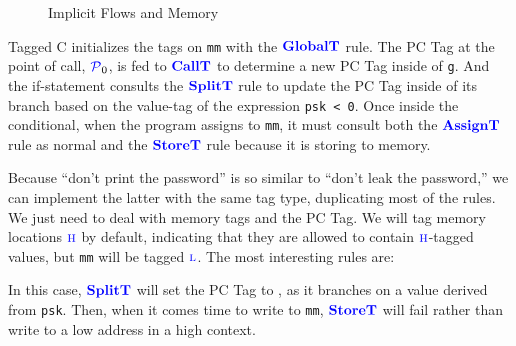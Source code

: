 \documentclass{llncs}
\begin{document}
\begin{figure}
\caption{Implicit Flows and Memory}
\label{fig:ex2}
\end{figure}

Tagged C initializes the tags on {\tt mm} with the \(\color{blue} \mathbf{GlobalT}\) rule. The PC Tag
at the point of call, \(\mathcal{\color{blue} P}_0\), is fed to \(\color{blue} \mathbf{CallT}\) to determine a new PC Tag
inside of {\tt g}. And the if-statement consults the \(\color{blue} \mathbf{SplitT}\) rule to update the PC Tag
inside of its branch based on the value-tag of the expression {\tt psk < 0}. Once inside the
conditional, when the program assigns to {\tt mm}, it must consult both the
\(\color{blue} \mathbf{AssignT}\) rule as normal and the \(\color{blue} \mathbf{StoreT}\) rule because it is storing
to memory.

Because ``don't print the password'' is so similar to ``don't leak the password,'' we can
implement the latter with the same tag type, duplicating most of the rules. We just need to
deal with memory tags and the PC Tag. We will tag memory
locations \(\textnormal{\color{blue} \sc h}\) by default, indicating that they are allowed to contain \(\textnormal{\color{blue} \sc h}\)-tagged values,
but {\tt mm} will be tagged \(\textnormal{\color{blue} \sc l}\). The most interesting rules are:

\begin{figure}
\end{figure}

In this case, \(\color{blue} \mathbf{SplitT}\) will set the PC Tag to \high, as it branches on a value derived from {\tt psk}.
Then, when it comes time to write to {\tt mm}, \(\color{blue} \mathbf{StoreT}\) will fail rather than write to a low address
in a high context.
\end{document}
